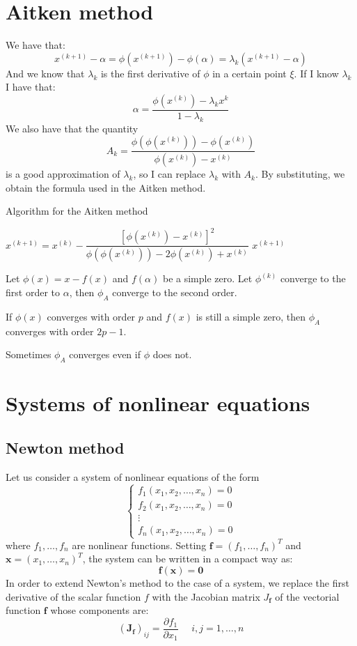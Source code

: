 \documentclass[12pt, a4paper]{report}
\newtheorem[style=M,bodystyle=\normalfont]{theorem}{Theorem}
\newtheorem[style=M,bodystyle=\normalfont]{proposition}{Proposition}
\newtheorem[style=M,bodystyle=\normalfont]{corollary}{Corollary}
\newtheorem[style=M,bodystyle=\normalfont]{lemma}{Lemma}
\newtheorem[style=M,bodystyle=\normalfont]{definition}{Definition}
\begin{document}
    \section{Aitken method}
    We have that: 
    \[x^{(k+1)}-\alpha=\phi(x^{(k+1)})-\phi(\alpha)=\lambda_k\left( x^{(k+1)}-\alpha \right)\]
    And we know that $\lambda_k$ is the first derivative of $\phi$ in a certain point $\xi$. If I know $\lambda_k$ I have that: 
    \[\alpha=\dfrac{\phi(x^{(k)})-\lambda_k x^{k}}{1-\lambda_k}\]
    We also have that the quantity 
    \[A_k=\dfrac{\phi(\phi(x^{(k)}))-\phi(x^{(k)})}{\phi(x^{(k)})-x^{(k)}}\]
    is a good approximation of $\lambda_k$, so I can replace $\lambda_k$ with $A_k$. By substituting, we obtain the formula used in the Aitken method. 
    \begin{algorithm}[H]
        \caption{Algorithm for the Aitken method}
            \begin{algorithmic}[1]
                    \State $x^{(k+1)}=x^{(k)}-\dfrac{\left[ \phi(x^{(k)})-x^{(k)} \right]^2}{\phi(\phi(x^{(k)}))-2\phi(x^{(k)})+x^{(k)}}$
                        \State \Return $x^{(k+1)}$
                    \EndIf
                \EndFor
            \end{algorithmic}
    \end{algorithm}
    \begin{theorem}
        Let $\phi(x)=x-f(x)$ and $f(\alpha)$ be a simple zero. Let $\phi^{(k)}$ converge to the first order to $\alpha$, then $\phi_A$ converge to the second order. 

        If $\phi(x)$ converges with order $p$ and $f(x)$ is still a simple zero, then $\phi_A$ converges with order $2p-1$. 
    \end{theorem}
    Sometimes $\phi_A$ converges even if $\phi$ does not. 

    \section{Systems of nonlinear equations}
    \subsection{Newton method}
    Let us consider a system of nonlinear equations of the form
    \[\begin{cases}
        f_1(x_1,x_2,\dots,x_n)=0 \\
        f_2(x_1,x_2,\dots,x_n)=0 \\
        \vdots                   \\
        f_n(x_1,x_2,\dots,x_n)=0 
    \end{cases}\]
    where $f_1,\dots,f_n$ are nonlinear functions. Setting $\textbf{f}=(f_1,\dots,f_n)^T$ and $\textbf{x}=(x_1,\dots,x_n)^T$, the system can be written in a compact way as: 
    \[\textbf{f}(\textbf{x})=\textbf{0}\]
    In order to extend Newton's method to the case of a system, we replace the first derivative of the scalar function $f$ with the Jacobian matrix $J_{\textbf{f}}$ of the vectorial 
    function $\textbf{f}$ whose components are: 
    \[(\textbf{J}_{\textbf{f}})_{ij}=\dfrac{\partial f_1}{\partial x_1} \:\:\:\:\:\: i,j=1,\dots,n\]
\end{document}
